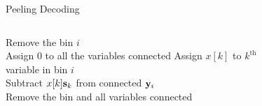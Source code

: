 \begin{frame}{Peeling Decoding}
\begin{columns}
\begin{algorithmic}
    \State Remove the bin $i$\\
   \hspace{2ex} Assign $0$ to all the variables connected
   \hspace{4ex} Assign $x[k]$ to $k^{\text{th}}$ variable in bin $i$\\
  \hspace{2ex} Subtract $x[k]\mathbf{s}_k$ from connected $\mathbf{y}_i$  \\
  \hspace{2ex} Remove the bin and all variables connected
\EndIf
\EndWhile
\end{algorithmic}


\begin{figure}
\scalebox{5}{}
\end{figure}

\end{columns}
\end{frame}

